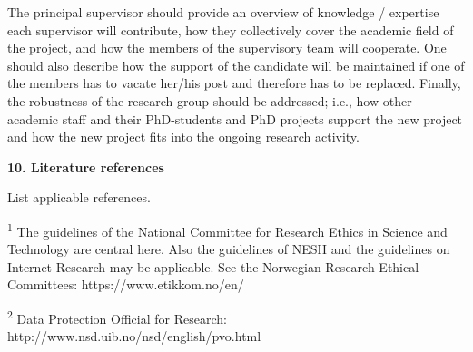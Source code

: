 \documentclass{article}
\begin{document}
The principal supervisor should provide an overview of knowledge / expertise each supervisor will contribute, how they collectively cover the academic field of the project, and how the members of the supervisory team will cooperate. One should also describe how the support of the candidate will be maintained if one of the members has to vacate her/his post and therefore has to be replaced. Finally, the robustness of the research group should be addressed; i.e., how other academic staff and their PhD-students and PhD projects support the new project and how the new project fits into the ongoing research activity.

\textbf{10. Literature references}

List applicable references.

\textsuperscript{1} The guidelines of the National Committee for Research Ethics in Science and Technology are central here. Also the guidelines of NESH and the guidelines on Internet Research may be applicable. See the Norwegian Research Ethical Committees: https://www.etikkom.no/en/

\textsuperscript{2}  Data Protection Official for Research: http://www.nsd.uib.no/nsd/english/pvo.html




\printbibliography %
\end{document}
